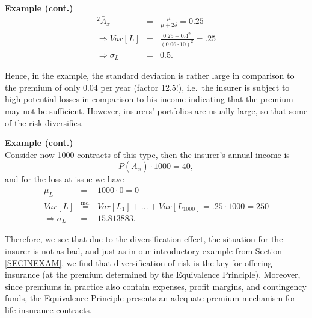 \documentclass[11pt,fleqn,oneside]{book}
\begin{document}
\noindent \textbf{Example (cont.)}
\begin{eqnarray*}
{^2\bar{A}_x} &=& \frac{\mu}{\mu + 2 \delta} = 0.25\\
\Rightarrow Var[L] &=&\frac{0.25 - 0.4^2}{(0.06 \cdot 10)^2} = .25\\
\Rightarrow \sigma_L &=& 0.5.
\end{eqnarray*}

Hence, in the example, the standard deviation is rather large in comparison to the premium of only 0.04 per year (factor 12.5!), i.e.\ the insurer is subject to high potential losses in comparison to his income indicating that the premium may not be sufficient. However, insurers' portfolios are usually large, so that some of the risk diversifies.

\noindent \textbf{Example (cont.)}\\
Consider now 1000 contracts of this type, then the insurer's annual income is
$$
{\bar{P}\left(\bar{A}_x\right)} \cdot 1000 = 40,
$$
and for the loss at issue we have
\begin{eqnarray*}
\mu_L &=& 1000\cdot 0 = 0\\
Var[L] &\stackrel{\text{ind.}}{=}& Var[L_1] + ... + Var[L_{1000}] = .25 \cdot 1000 = 250\\
\Rightarrow \sigma_L &=& 15.813883. 
\end{eqnarray*}

Therefore, we see that due to the diversification effect, the situation for the insurer is not as bad, and just as in our introductory example from Section \ref{SECINEXAM}, we find that diversification of risk is the key for offering insurance (at the premium determined by the Equivalence Principle). Moreover, since premiums in practice also contain expenses, profit margins, and contingency funds, the Equivalence Principle presents an adequate premium mechanism for life insurance contracts. 
\end{document}
